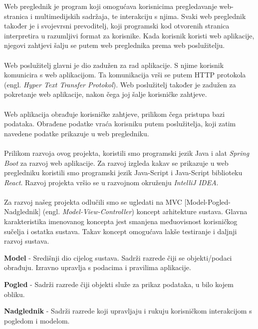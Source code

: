 		\text	Web preglednik je program koji omogućava korisnicima pregledavanje web-stranica i multimedijskih sadržaja, te interakciju s njima. Svaki web preglednik također je i svojevrsni prevoditelj, koji programski kod otvorenih stranica interpretira u razumljivi format za korisnike. Kada korisnik koristi web aplikacije, njegovi zahtjevi šalju se putem web preglednika prema web poslužitelju. \\
		\\
		\text	Web poslužitelj glavni je dio zadužen za rad aplikacije. S njime korisnik komunicira s web aplikacijom. Ta komunikacija vrši se putem HTTP protokola (engl. \textit{Hyper Text Transfer Protokol}). Web poslužitelj također je zadužen za pokretanje web aplikacije, nakon čega joj šalje korisničke zahtjeve. \\
		\\
		\text	Web aplikacija obrađuje korisničke zahtjeve, prilikom čega pristupa bazi podataka. Obrađene podatke vraća korisniku putem poslužitelja, koji zatim navedene podatke prikazuje u web pregledniku. \\
		\\
		\text	Prilikom razvoja ovog projekta, koristili smo programski jezik Java i alat \textit{Spring Boot} za razvoj web aplikacije. Za razvoj izgleda kakav se prikazuje u web pregledniku koristili smo programski jezik Java-Script i Java-Script biblioteku \textit{React}. Razvoj projekta vršio se u razvojnom okruženju \textit{IntelliJ IDEA}.  \\
		\\
		\text	Za razvoj našeg projekta odlučili smo se ugledati na MVC [Model-Pogled-Nadglednik] (engl. \textit{Model-View-Controller}) koncept arhitekture sustava. Glavna karakteristika imenovanog koncepta jest smanjena međuovisnost korisničkog sučelja i ostatka sustava. Takav koncept omogućava lakše testiranje i daljnji razvoj sustava.
		\begin{packed_item}
			\item \textbf{Model} - Središnji dio cijelog sustava. Sadrži razrede čiji se objekti/podaci obrađuju. Izravno upravlja s podacima i pravilima aplikacije.
			\item \textbf{Pogled} - Sadrži razrede čiji objekti služe za prikaz podataka, u bilo kojem obliku.
			\item \textbf{Nadglednik} - Sadrži razrede koji upravljaju i rukuju korisničkom interakcijom s pogledom i modelom. 
		\end{packed_item}
		\clearpage
		
